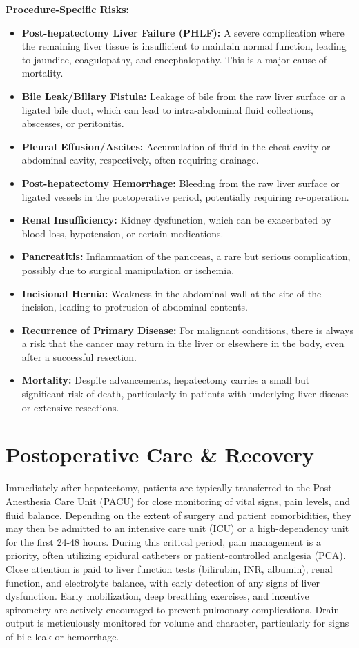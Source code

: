 \textbf{Procedure-Specific Risks:}
\begin{itemize}
  \item \textbf{Post-hepatectomy Liver Failure (PHLF):} A severe complication where the remaining liver tissue is insufficient to maintain normal function, leading to jaundice, coagulopathy, and encephalopathy. This is a major cause of mortality.
  \item \textbf{Bile Leak/Biliary Fistula:} Leakage of bile from the raw liver surface or a ligated bile duct, which can lead to intra-abdominal fluid collections, abscesses, or peritonitis.
  \item \textbf{Pleural Effusion/Ascites:} Accumulation of fluid in the chest cavity or abdominal cavity, respectively, often requiring drainage.
  \item \textbf{Post-hepatectomy Hemorrhage:} Bleeding from the raw liver surface or ligated vessels in the postoperative period, potentially requiring re-operation.
  \item \textbf{Renal Insufficiency:} Kidney dysfunction, which can be exacerbated by blood loss, hypotension, or certain medications.
  \item \textbf{Pancreatitis:} Inflammation of the pancreas, a rare but serious complication, possibly due to surgical manipulation or ischemia.
  \item \textbf{Incisional Hernia:} Weakness in the abdominal wall at the site of the incision, leading to protrusion of abdominal contents.
  \item \textbf{Recurrence of Primary Disease:} For malignant conditions, there is always a risk that the cancer may return in the liver or elsewhere in the body, even after a successful resection.
  \item \textbf{Mortality:} Despite advancements, hepatectomy carries a small but significant risk of death, particularly in patients with underlying liver disease or extensive resections.
\end{itemize}

\section*{Postoperative Care \& Recovery}
Immediately after hepatectomy, patients are typically transferred to the Post-Anesthesia Care Unit (PACU) for close monitoring of vital signs, pain levels, and fluid balance. Depending on the extent of surgery and patient comorbidities, they may then be admitted to an intensive care unit (ICU) or a high-dependency unit for the first 24-48 hours. During this critical period, pain management is a priority, often utilizing epidural catheters or patient-controlled analgesia (PCA). Close attention is paid to liver function tests (bilirubin, INR, albumin), renal function, and electrolyte balance, with early detection of any signs of liver dysfunction. Early mobilization, deep breathing exercises, and incentive spirometry are actively encouraged to prevent pulmonary complications. Drain output is meticulously monitored for volume and character, particularly for signs of bile leak or hemorrhage.

